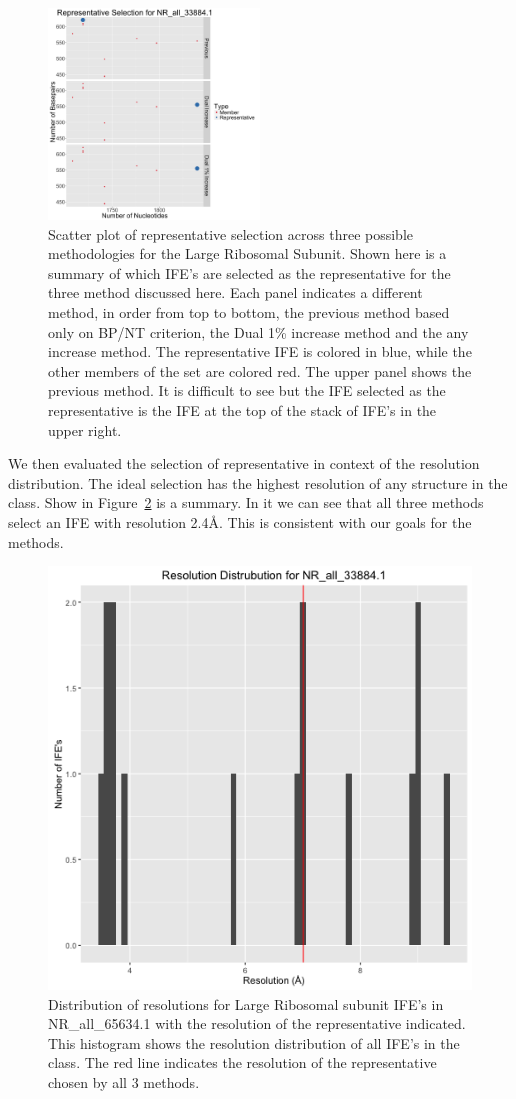 \begin{figure}
  \includegraphics[width=0.5\textwidth]{chapter-4/figs/hm-lsu-rep}
  \caption{Scatter plot of representative selection across three possible
    methodologies for the \HM{} Large Ribosomal Subunit. Shown here is a summary
    of which IFE’s are selected as the representative for the three method discussed
    here. Each panel indicates a different method, in order from top to bottom,
    the previous method based only on BP/NT criterion, the Dual 1\% increase
    method and the any increase method. The representative IFE is colored in
    blue, while the other members of the set are colored red. The upper panel
    shows the previous method. It is difficult to see but the IFE selected as
    the representative is the IFE at the top of the stack of IFE’s in the upper
    right.}
  \label{fig:hm-lsu-rep}
\end{figure}

We then evaluated the selection of representative in context of the resolution
distribution. The ideal selection has the highest resolution of any structure in
the class. Show in Figure~\ref{fig:hm-rep-res-dist} is a summary. In it we can
see that all three methods select an IFE with resolution 2.4{\AA}. This is
consistent with our goals for the methods.

\begin{figure}
  \includegraphics[width=0.5\linewidth]{chapter-4/figs/hm-lsu-res}
  \caption{Distribution of resolutions for \HM{} Large Ribosomal subunit IFE’s
    in NR\_all\_65634.1 with the resolution of the representative indicated.
    This histogram shows the resolution distribution of all IFE’s in the
    class. The red line indicates the resolution of the representative chosen by
  all 3 methods.}
  \label{fig:hm-rep-res-dist}
\end{figure}

